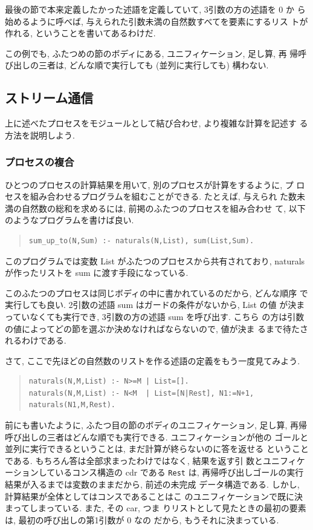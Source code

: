\documentclass[a4,titlepage]{jsreport}
\newenvironment{program}{\begin{quote}}{\end{quote}}
\begin{document}
最後の節で本来定義したかった述語を定義していて, 3引数の方の述語を 0 か
ら始めるように呼べば, 与えられた引数未満の自然数すべてを要素にするリス
トが作れる, ということを書いてあるわけだ.

この例でも, ふたつめの節のボディにある, ユニフィケーション, 足し算, 再
帰呼び出しの三者は, どんな順で実行しても (並列に実行しても) 構わない.

\subsection{ストリーム通信}
上に述べたプロセスをモジュールとして結び合わせ, より複雑な計算を記述す
る方法を説明しよう.

\subsubsection{プロセスの複合}\label{natsum}
ひとつのプロセスの計算結果を用いて, 別のプロセスが計算をするように, プ
ロセスを組み合わせるプログラムを組むことができる.  たとえば, 与えられ
た数未満の自然数の総和を求めるには, 前掲のふたつのプロセスを組み合わせ
て, 以下のようなプログラムを書けば良い.
\begin{program}
\begin{verbatim}
sum_up_to(N,Sum) :- naturals(N,List), sum(List,Sum).
\end{verbatim}
\end{program}
このプログラムでは変数 List がふたつのプロセスから共有されており,
naturals が作ったリストを sum に渡す手段になっている.

このふたつのプロセスは同じボディの中に書かれているのだから, どんな順序
で実行しても良い.  2引数の述語 sum はガードの条件がないから, List の値
が決まっていなくても実行でき, 3引数の方の述語 sum を呼び出す.  こちら
の方は引数の値によってどの節を選ぶか決めなければならないので, 値が決ま
るまで待たされるわけである.

さて, ここで先ほどの自然数のリストを作る述語の定義をもう一度見てみよう.
\begin{program}
\begin{Verbatim}[baselinestretch=0.8]
naturals(N,M,List) :- N>=M | List=[].
naturals(N,M,List) :- N<M  | List=[N|Rest], N1:=N+1, naturals(N1,M,Rest).
\end{Verbatim}
\end{program}
前にも書いたように, ふたつ目の節のボディのユニフィケーション, 足し算, 
再帰呼び出しの三者はどんな順でも実行できる.  ユニフィケーションが他の
ゴールと並列に実行できるということは, まだ計算が終らないのに答を返せる
ということである.  もちろん答は全部求まったわけではなく, 結果を返す引
数とユニフィケーションしているコンス構造の cdr である {\tt Rest} は, 
再帰呼び出しゴールの実行結果が入るまでは変数のままだから, 前述の未完成
データ構造である.  しかし, 計算結果が全体としてはコンスであることはこ
のユニフィケーションで既に決まってしまっている.  また, その car, つま
りリストとして見たときの最初の要素は, 最初の呼び出しの第1引数が 0 なの
だから, もうそれに決まっている.
\end{document}
